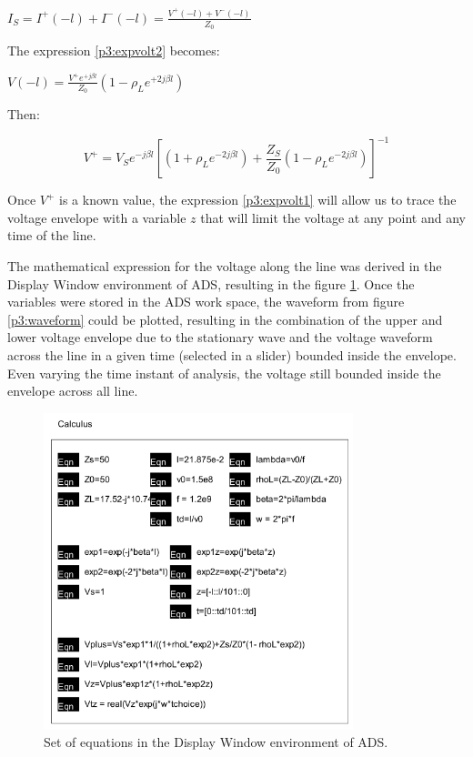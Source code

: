 \begin{center} 
    $I_S = I^+(-l) + I^-(-l) = \frac{V^+(-l) + V^-(-l)}{Z_0}$
\end{center}

The expression \ref{p3:expvolt2} becomes:

\begin{center} 
    $V(-l) = \frac{V^+ e^{+j\beta l}}{Z_0} (1- \rho_L e^{+2j \beta l})$
\end{center}

Then:

\begin{equation} \label{p3:expvolt5}
    V^+ = V_S e^{-j \beta l} [(1+\rho_L e^{-2j\beta l})+\frac{Z_S}{Z_0}(1-\rho_L e^{-2j\beta l})]^{-1}
\end{equation}

Once $V^+$ is a known value, the expression \ref{p3:expvolt1} will allow us to trace the voltage envelope with a variable $z$ that will limit the voltage at any point and any time of the line.

The mathematical expression for the voltage along the line was derived in the Display Window environment of ADS, resulting in the figure \ref{calculus}. Once the variables were stored in the ADS work space, the waveform from figure \ref{p3:waveform} could be plotted, resulting in the combination of the upper and lower voltage envelope due to the stationary wave and the voltage waveform across the line in a given time (selected in a slider) bounded inside the envelope. Even varying the time instant of analysis, the voltage still bounded inside the envelope across all line.

\begin{figure}[H] 
\centering
\includegraphics[width=9cm]{images/calculus.png}
\caption{Set of equations in the Display Window environment of ADS.}
\label{calculus} 
\end{figure}

